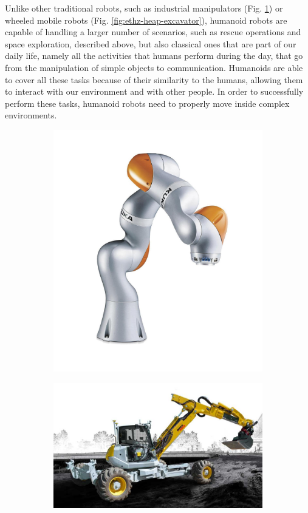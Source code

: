 Unlike other traditional robots, such as industrial manipulators (Fig.
\ref{fig:kuka-lwr-IV}) or wheeled mobile robots
(Fig. \ref{fig:ethz-heap-excavator}),
humanoid robots are capable of handling a larger number of scenarios, such as 
rescue operations and space exploration, described above, but also classical
ones that are part of our daily life, namely all the activities that humans
perform during the day, that go from the manipulation of simple objects to
communication. Humanoids are able to cover all these tasks because of their
similarity to the humans, allowing them to interact with our environment and 
with other people. In order to successfully perform these tasks, humanoid 
robots need to properly move inside complex environments.
\begin{figure}
  \centering
  \begin{subfigure}[b]{0.3\textwidth}
    \includegraphics[width=\textwidth]{figures/kuka-lwr-IV.jpg}
    \caption{}
    \label{fig:kuka-lwr-IV}
  \end{subfigure}
  \begin{subfigure}[b]{0.6\textwidth}
    \includegraphics[width=\textwidth]{figures/ethz-heap-excavator.jpg}

\end{subfigure}
\end{figure}
